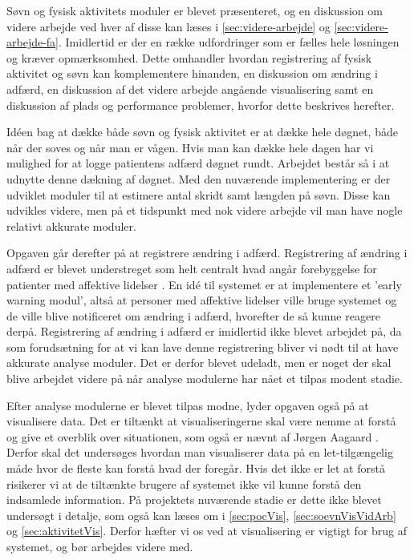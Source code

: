 Søvn og fysisk aktivitets moduler er blevet præsenteret, og en diskussion om videre arbejde ved hver af disse kan læses i \cref{sec:videre-arbejde} og \cref{sec:videre-arbejde-fa}.
Imidlertid er der en række udfordringer som er fælles hele løsningen og kræver opmærksomhed.
Dette omhandler hvordan registrering af fysisk aktivitet og søvn kan komplementere hinanden, en diskussion om ændring i adfærd, en diskussion af det videre arbejde angående visualisering samt en diskussion af plads og performance problemer, hvorfor dette beskrives herefter.

Idéen bag at dække både søvn og fysisk aktivitet er at dække hele døgnet, både når der soves og når man er vågen. 
Hvis man kan dække hele dagen har vi mulighed for at logge patientens adfærd døgnet rundt.
Arbejdet består så i at udnytte denne dækning af døgnet.
Med den nuværende implementering er der udviklet moduler til at estimere antal skridt samt længden på søvn.
Disse kan udvikles videre, men på et tidspunkt med nok videre arbejde vil man have nogle relativt akkurate moduler.

Opgaven går derefter på at registrere ændring i adfærd. 
Registrering af ændring i adfærd er blevet understreget som helt centralt hvad angår forebyggelse for patienter med affektive lidelser \citep[Kapitel 1, Sektion 4]{misc:faellesrapp}.
En idé til systemet er at implementere et 'early warning modul', altså at personer med affektive lidelser ville bruge systemet og de ville blive notificeret om ændring i adfærd, hvorefter de så kunne reagere derpå. 
Registrering af ændring i adfærd er imidlertid ikke blevet arbejdet på, da som forudsætning for at vi kan lave denne registrering bliver vi nødt til at have akkurate analyse moduler.
Det er derfor blevet udeladt, men er noget der skal blive arbejdet videre på når analyse modulerne har nået et tilpas modent stadie.

Efter analyse modulerne er blevet tilpas modne, lyder opgaven også på at visualisere data.
Det er tiltænkt at visualiseringerne skal være nemme at forstå og give et overblik over situationen, som også er nævnt af Jørgen Aagaard \citep[Kapitel 1, Sektion 4]{misc:faellesrapp}. 
Derfor skal det undersøges hvordan man visualiserer data på en let-tilgængelig måde hvor de fleste kan forstå hvad der foregår. 
Hvis det ikke er let at forstå risikerer vi at de tiltænkte brugere af systemet ikke vil kunne forstå den indsamlede information.
På projektets nuværende stadie er dette ikke blevet undersøgt i detalje, som også kan læses om i \cref{sec:pocVis}, \cref{sec:soevnVisVidArb} og \cref{sec:aktivitetVis}. 
Derfor hæfter vi os ved at visualisering er vigtigt for brug af systemet, og bør arbejdes videre med.

